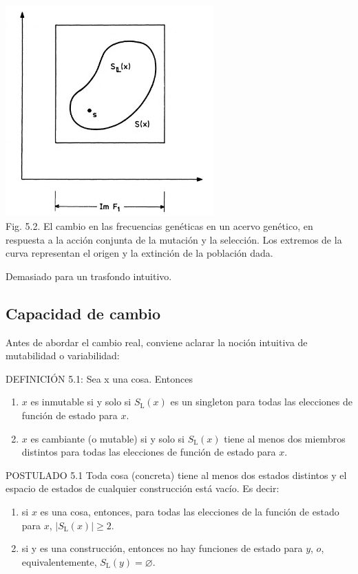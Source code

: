 \begin{justifying}
	\begin{center}
		\includegraphics[width=0.6\textwidth]{img/Figura5-2.png}
		\\ \scriptsize Fig. 5.2. El cambio en las frecuencias genéticas en un acervo genético,
		en respuesta a la acción conjunta de la mutación y la selección.
		Los extremos de la curva representan el origen y la extinción de la población dada.
	\end{center}
    Demasiado para un trasfondo intuitivo.

    \subsection{Capacidad de cambio}
    \noindent Antes de abordar el cambio real, conviene aclarar la noción intuitiva
    de mutabilidad o variabilidad:

    \bigskip

    \noindent DEFINICIÓN 5.1: Sea x una cosa. Entonces
    \begin{enumerate}[label=(\roman*)]
        \item $x$ es inmutable si y solo si $S_\mathrm{L}(x)$ es un singleton para todas las elecciones de función de estado para $x$.
        \item $x$ es cambiante (o mutable) si y solo si $S_\mathrm{L}(x)$ tiene al menos dos miembros distintos
            para todas las elecciones de función de estado para $x$.
    \end{enumerate}

    \bigskip

    \noindent POSTULADO 5.1 Toda cosa (concreta) tiene al menos dos estados distintos y 
    el espacio de estados de cualquier construcción está vacío. Es decir:
    \begin{enumerate}[label=(\roman*)]
        \item si $x$ es una cosa, entonces, para todas las elecciones de la función de estado para $x$, $|S_\mathrm{L}(x)| \geq 2$.
        \item si y es una construcción, entonces no hay funciones de estado para $y$, $o$, equivalentemente, $S_\mathrm{L}(y) = \varnothing$.
    \end{enumerate}


\end{justifying}
